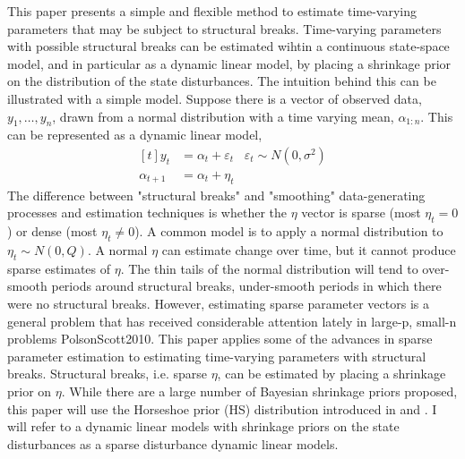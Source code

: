 \documentclass{article}
\begin{document}
This paper presents a simple and flexible method to estimate time-varying parameters that may be subject to structural breaks.
Time-varying parameters with possible structural breaks can be estimated wihtin a continuous state-space model, and in particular as a dynamic linear model, by placing a shrinkage prior on the distribution of the state disturbances.
The intuition behind this can be illustrated with a simple model.
Suppose there is a vector of observed data, $y_{1}, \dots, y_{n}$, drawn from a normal distribution with a time varying mean, $\alpha_{1:n}$. 
This can be represented as a dynamic linear model,
\begin{equation}
  \label{eq:4}
  \begin{aligned}[t]
    y_{t} &= \alpha_{t} + \varepsilon_{t} & \varepsilon_{t} \sim N(0, \sigma^{2}) \\
    \alpha_{t + 1} &= \alpha_{t} + \eta_{t}
  \end{aligned}
\end{equation}
The difference between "structural breaks" and "smoothing" data-generating processes and estimation techniques is whether the $\eta$ vector is sparse (most $\eta_{t} = 0$) or dense (most $\eta_{t} \neq 0$).
A common model is to apply a normal distribution to $\eta_{t} \sim N(0, Q)$.
A normal $\eta$ can estimate change over time, but it cannot produce sparse estimates of $\eta$.
The thin tails of the normal distribution will tend to over-smooth periods around structural breaks, under-smooth periods in which there were no structural breaks.
However, estimating sparse parameter vectors is a general problem that has received considerable attention lately in large-p, small-n problems \textcite{Tibshirani1996}{PolsonScott2010}.
This paper applies some of the advances in sparse parameter estimation to estimating time-varying parameters with structural breaks.
Structural breaks, i.e. sparse $\eta$, can be estimated by placing a shrinkage prior on $\eta$.
While there are a large number of Bayesian shrinkage priors proposed, this paper will use the Horseshoe prior (HS) distribution introduced in \textcites{CarvalhoPolsonScott2009} and \textcite{CarvalhoPolsonScott2010}.
I will refer to a dynamic linear models with shrinkage priors on the state disturbances as a sparse disturbance dynamic linear models.
\end{document}
